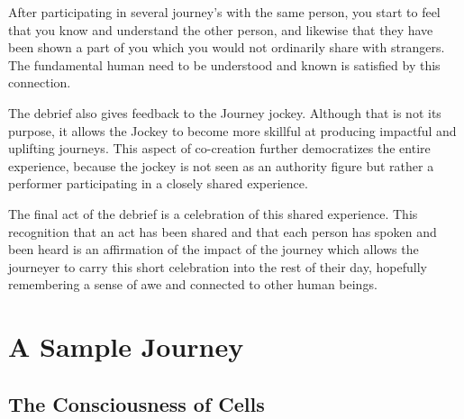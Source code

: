 \documentclass[12pt]{book}
\begin{document}
After participating in several journey’s with the same person, you start to feel that you know and understand the other person, and likewise that they have been shown a part of you which you would not ordinarily share with strangers. The fundamental human need to be understood and known is satisfied by this connection.
					
The debrief also gives feedback to the Journey jockey. Although that is not its purpose, it allows  the Jockey to become more skillful at producing impactful and uplifting journeys. This aspect of co-creation further democratizes the entire experience, because the jockey is not seen as an authority figure but rather a performer participating in a closely shared experience.
				
					
The final act of the debrief is a celebration of this shared experience. This recognition that an act has been shared and that each person has spoken and been heard is an affirmation of the impact of the journey which allows the journeyer to carry this short celebration into the rest of their day, hopefully remembering a sense of awe and connected to other human beings.


\chapter{A Sample Journey}


\section{The Consciousness of Cells}
\end{document}
